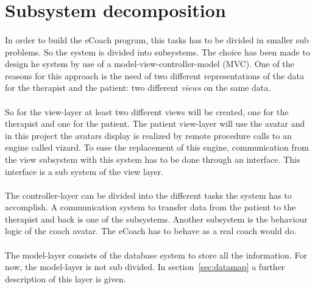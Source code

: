 \section{Subsystem decomposition}
\label{sec:subsystem}

\paragraph{}
In order to build the eCoach program, this tasks has to be divided in smaller sub problems. So the system is divided into subsystems. The choice has been made to design he system by use of a \gls{model-view-controller}-model (MVC). One of the reasons for this approach is the need of two different representations of the data for the therapist and the patient: two different \textit{views} on the same data.
\paragraph{}
So for the view-layer at least two different views will be created, one for the therapist and one for the patient. The patient view-layer will  use the avatar and in this project the avatars display is realized by remote procedure calls to an engine called vizard. To ease the replacement of this engine, communication from the view subsystem with this system has to be done through an interface. This interface is a sub system of the view layer.
\paragraph{}
The controller-layer can be divided into the different tasks the system has to accomplish. A communication system to transfer data from the patient to the therapist and back is one of the subsystems. Another subsystem is the behaviour logic of the coach avatar. The eCoach has to behave as a real coach would do. 
\paragraph{}
The model-layer consists of the database system to store all the information. For now, the model-layer is not sub divided. In section~\ref{sec:datamap} a further description of this layer is given.
